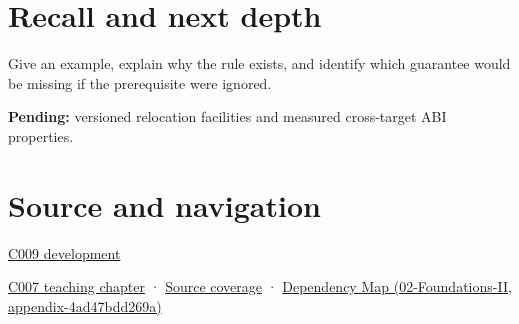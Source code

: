 \section{Recall and next depth}\label{appendix-958870a64c53-recall-and-next-depth}

Give an example, explain why the rule exists, and identify which guarantee would be missing if the prerequisite were ignored.

\textbf{Pending:} versioned relocation facilities and measured cross-target ABI properties.

\section{Source and navigation}\label{appendix-958870a64c53-source-and-navigation}

\hyperref[appendix-fd090d982a15-m009---parts-127-147]{C009 development}

\href{Continuous\%20Notes/Computing\%20Foundations\%20-\%20From\%20Bits\%20to\%20C++\%20and\%20Systems\%20APIs\#Bringing\%20the\%20object\%20model\%20back\%20to\%20bytes}{C007 teaching chapter} · \hyperref[appendix-fd090d982a15-m007---parts-101-112]{Source coverage} · \href{../02-Foundations-II/main.pdf\#nameddest=appendix-4ad47bdd269a}{Dependency Map (02-Foundations-II, appendix-4ad47bdd269a)}

